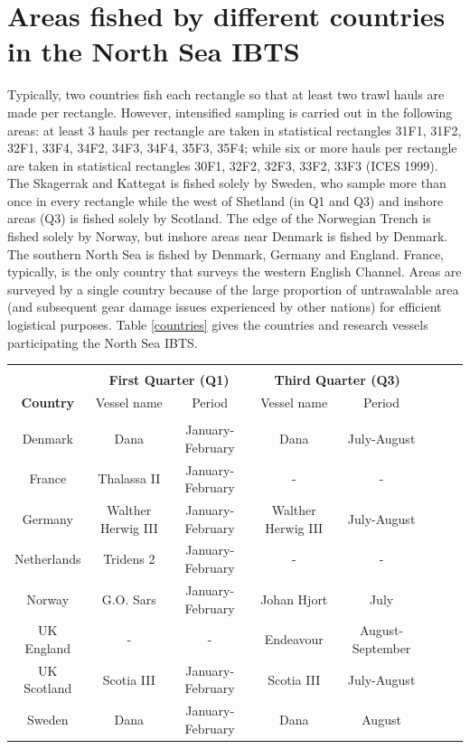 \documentclass[a4paper 12pt]{article}
\numberwithin{equation}{section}
\begin{document}
\section{\large Areas fished by different countries in the North Sea IBTS}
\label{secAp:areasfishedappendix}
Typically, two countries fish each rectangle so that at least two trawl hauls are made per rectangle. However, intensified sampling is carried out in the following areas: at least 3 hauls per rectangle are taken in statistical rectangles  31F1, 31F2, 32F1, 33F4, 34F2, 34F3, 34F4, 35F3, 35F4; while six or more hauls per rectangle are taken in statistical rectangles  30F1, 32F2, 32F3, 33F2, 33F3 (ICES 1999).  The Skagerrak and Kattegat is fished solely by Sweden, who sample more than once in every rectangle while the west of Shetland (in Q1 and Q3) and inshore areas (Q3) is fished solely by Scotland. The edge of the Norwegian Trench is fished solely by Norway, but inshore areas near Denmark is fished by Denmark. The southern North Sea is fished by Denmark, Germany and England. France, typically, is the only country that surveys the western English Channel. Areas are surveyed by a single country because of the large proportion of untrawalable area (and subsequent gear damage issues experienced by other nations)  for efficient logistical purposes. Table \ref{countries} gives the countries and research vessels participating the North Sea IBTS.\\
\begin{small}
\begin{table}[h!]
\centering
{}
\begin{tabular}{cccccccc}
\hline \\[0.1ex]
  & \multicolumn{2}{c}{\bf First Quarter (Q1)} & \multicolumn{2}{c}{\bf Third Quarter (Q3)}\\[1.5ex]
{\bf Country }  & Vessel name & Period    & Vessel name & Period  \\[0.5ex]
\hline \\[0.5ex]
Denmark  &   Dana   &   January-February  & Dana & July-August    \\[1ex]
France  & Thalassa II & January-February & - & -   \\[1ex]
Germany   &  Walther  Herwig III & January-February   &   Walther  Herwig III & July-August \\[1ex]
Netherlands &  Tridens 2 &  January-February   & - & -     \\[1ex]
Norway  &   G.O. Sars  & January-February &    Johan Hjort  & July   \\[1ex]
UK England &- & -&  Endeavour &  August-September  \\[1ex]
UK Scotland   &  Scotia III &  January-February & Scotia III &  July-August \\[1ex]
Sweden  &  Dana &  January-February  &  Dana &  August                  \\[0.5ex]
\hline
\end{tabular}
\end{table}
\end{small}
\end{document}
